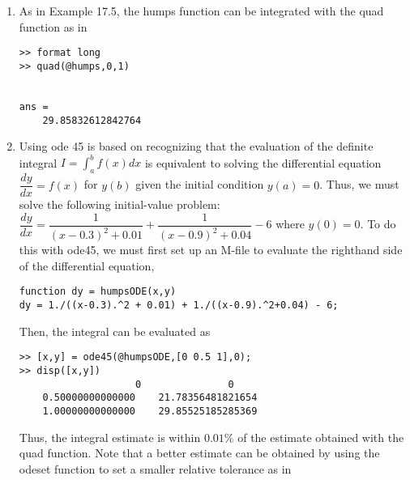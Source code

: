 \documentclass[../main.tex]{subfiles}
\begin{document}
\section{}
\begin{enumerate}[label=\bfseries(\alph*)]
\item As in Example 17.5, the humps function can be integrated with the quad function as in
	\bigbreak
\begin{lstlisting}[numbers=none]
>> format long
>> quad(@humps,0,1)


ans =
 	29.85832612842764 
\end{lstlisting}
	\bigbreak
\item Using ode 45 is based on recognizing that the evaluation of the definite integral
	\bigbreak
$\displaystyle I=\int_{a}^{b} f(x) d x$
	\bigbreak
is equivalent to solving the differential equation
	\bigbreak
$\dfrac{d y}{d x}=f(x)$
	\bigbreak
for $y(b)$ given the initial condition $y(a)=0$. Thus, we must solve the following initial-value problem:
	\bigbreak
$\dfrac{d y}{d x}=\dfrac{1}{(x-0.3)^{2}+0.01}+\dfrac{1}{(x-0.9)^{2}+0.04}-6$
	\bigbreak
where $y(0)=0$. To do this with ode45, we must first set up an M-file to evaluate the righthand side of the differential equation,
	\bigbreak
\begin{lstlisting}[numbers=none]
function dy = humpsODE(x,y)
dy = 1./((x-0.3).^2 + 0.01) + 1./((x-0.9).^2+0.04) - 6;
\end{lstlisting}
	\bigbreak
Then, the integral can be evaluated as 
	\bigbreak
\begin{lstlisting}[numbers=none]
>> [x,y] = ode45(@humpsODE,[0 0.5 1],0);
>> disp([x,y])
 			        0 				0
 	0.50000000000000 	21.78356481821654
 	1.00000000000000 	29.85525185285369 
\end{lstlisting}
	\bigbreak
Thus, the integral estimate is within $0.01 \%$ of the estimate obtained with the quad function. Note that a better estimate can be obtained by using the odeset function to set a smaller relative tolerance as in
	\bigbreak
\end{enumerate}
\end{document}
